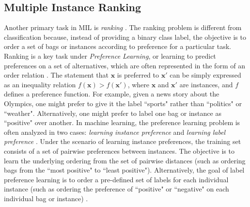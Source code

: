 \subsection{Multiple Instance Ranking}

Another primary task in MIL is \textit{ranking} \citep{Carbonneau2016MILSurvey}.  The ranking problem is different from classification because, instead of providing a binary class label, the objective is to order a set of bags \citep{Bergeron2008MIRanking,Bergeron2012FastBundleMILRanking} or instances \citep{Hu2008MIRanking} according to preference for a particular task.  Ranking is a key task under \textit{Preference Learning}, or learning to predict preferences on a set of alternatives, which are often represented in the form of an order relation \citep{Furnkranz2003RankingSummary}.  The statement that $\bm{x}$ is preferred to $\bm{x}'$ can be simply expressed as an inequality relation $f(\bm{x}) > f(\bm{x}')$, where $\bm{x}$ and $\bm{x}'$ are instances, and $f$ defines a preference function.  For example, given a news story about the Olympics, one might prefer to give it the label ``sports" rather than ``politics" or ``weather".  Alternatively, one might prefer to label one bag or instance as ``positive" over another.  In machine learning, the preference learning problem is often analyzed in two cases: \textit{learning instance preference} and \textit{learning label preference} \citep{Chu2005LearningPreferencesWithGaussianProcesses}.  Under the scenario of learning instance preferences, the training set consists of a set of pairwise preferences between instances.  The objective is to learn the underlying ordering from the set of pairwise distances (such as ordering bags from the ``most positive" to ``least positive").  Alternatively, the goal of label preference learning is to order a pre-defined set of labels for each individual instance (such as ordering the preference of ``positive" or ``negative" on each individual bag or instance) \citep{Dekel2004Ranking,Aiolli2004LearningPreferences}.   

